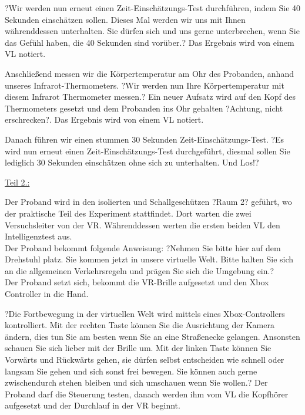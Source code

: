 \documentclass{Bericht}
\begin{document}
\par

?Wir werden nun erneut einen Zeit-Einschätzungs-Test durchführen, indem Sie 40 Sekunden einschätzen sollen. Dieses Mal werden wir uns mit Ihnen währenddessen unterhalten. Sie dürfen sich und uns gerne unterbrechen, wenn Sie das Gefühl haben, die 40 Sekunden sind vorüber.? Das Ergebnis wird von einem VL notiert.

\par

Anschließend messen wir die Körpertemperatur am Ohr des Probanden, anhand unseres Infrarot-Thermometers. ?Wir werden nun Ihre Körpertemperatur mit diesem Infrarot Thermometer messen.? Ein neuer Aufsatz wird auf den Kopf des Thermometers gesetzt und dem Probanden ins Ohr gehalten ?Achtung, nicht erschrecken?. Das Ergebnis wird von einem VL notiert.

\par

Danach führen wir einen stummen 30 Sekunden Zeit-Einschätzungs-Test. ?Es wird nun erneut einen Zeit-Einschätzungs-Test durchgeführt, diesmal sollen Sie lediglich 30 Sekunden einschätzen ohne sich zu unterhalten. Und Los!?

\par

\underline{Teil 2.:} 

Der Proband wird in den isolierten und Schallgeschützen ?Raum 2? geführt, wo der praktische Teil des Experiment stattfindet. Dort warten die zwei Versuchsleiter von der VR. Währenddessen werten die ersten beiden VL den Intelligenztest aus.  \\

Der Proband bekommt folgende Anweisung: ?Nehmen Sie bitte hier auf dem Drehstuhl platz. Sie kommen jetzt in unsere virtuelle Welt. Bitte halten Sie sich an die allgemeinen Verkehrsregeln und prägen Sie sich die Umgebung ein.? \\

Der Proband setzt sich, bekommt die VR-Brille aufgesetzt und den Xbox Controller in die Hand.

?Die Fortbewegung in der virtuellen Welt wird mittels eines Xbox-Controllers kontrolliert. Mit der rechten Taste können Sie die Ausrichtung der Kamera ändern, dies tun Sie am besten wenn Sie an eine Straßenecke gelangen. Ansonsten schauen Sie sich lieber mit der Brille um. Mit der linken Taste können Sie Vorwärts und Rückwärts gehen, sie dürfen selbst entscheiden wie schnell oder langsam Sie gehen und sich sonst frei bewegen. Sie können auch gerne zwischendurch stehen bleiben und sich umschauen wenn Sie wollen.? Der Proband darf die Steuerung testen, danach werden ihm vom VL die Kopfhörer aufgesetzt und der Durchlauf in der VR beginnt. 
\end{document}
